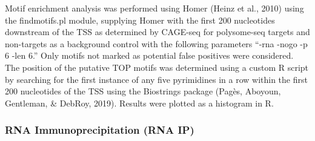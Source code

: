 \documentclass[12pt,oneside]{reedthesis}
\begin{document}
Motif enrichment analysis was performed using Homer (Heinz et al., 2010) using the findmotifs.pl module, supplying Homer with the first 200 nucleotides downstream of the TSS as determined by CAGE-seq for polysome-seq targets and non-targets as a background control with the following parameters ``-rna -nogo -p 6 -len 6.'' Only motifs not marked as potential false positives were considered. The position of the putative TOP motifs was determined using a custom R script by searching for the first instance of any five pyrimidines in a row within the first 200 nucleotides of the TSS using the Biostrings package (Pagès, Aboyoun, Gentleman, \& DebRoy, 2019). Results were plotted as a histogram in R.

\hypertarget{rna-immunoprecipitation-rna-ip}{%
\subsubsection{RNA Immunoprecipitation (RNA IP)}\label{rna-immunoprecipitation-rna-ip}}
\end{document}
